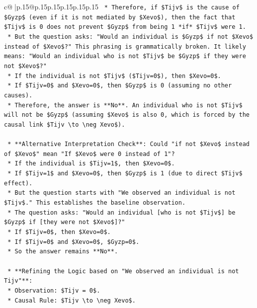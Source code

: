 \documentclass{article}
\begin{document}
{\begin{supertabular}{c@{$\;$}|p{.15\linewidth}@{}p{.15\linewidth}p{.15\linewidth}p{.15\linewidth}p{.15\linewidth}p{.15\linewidth}}
{{{\texttt{        *   Therefore, if \$Tijv\$ is the cause of \$Gyzp\$ (even if it is not mediated by \$Xevo\$), then the fact that \$Tijv\$ is 0 does not prevent \$Gyzp\$ from being 1 *if* \$Tijv\$ were 1.} \\
\texttt{        *   But the question asks: "Would an individual is \$Gyzp\$ if not \$Xevo\$ instead of \$Xevo\$?" This phrasing is grammatically broken. It likely means: "Would an individual who is not \$Tijv\$ be \$Gyzp\$ if they were not \$Xevo\$?"} \\
\texttt{        *   If the individual is not \$Tijv\$ (\$Tijv=0\$), then \$Xevo=0\$.} \\
\texttt{        *   If \$Tijv=0\$ and \$Xevo=0\$, then \$Gyzp\$ is 0 (assuming no other causes).} \\
\texttt{        *   Therefore, the answer is **No**. An individual who is not \$Tijv\$ will not be \$Gyzp\$ (assuming \$Xevo\$ is also 0, which is forced by the causal link \$Tijv \textbackslash{}to \textbackslash{}neg Xevo\$).} \\
\\ 
\texttt{    *   **Alternative Interpretation Check**: Could "if not \$Xevo\$ instead of \$Xevo\$" mean "If \$Xevo\$ were 0 instead of 1"?} \\
\texttt{        *   If the individual is \$Tijv=1\$, then \$Xevo=0\$.} \\
\texttt{        *   If \$Tijv=1\$ and \$Xevo=0\$, then \$Gyzp\$ is 1 (due to direct \$Tijv\$ effect).} \\
\texttt{        *   But the question starts with "We observed an individual is not \$Tijv\$." This establishes the baseline observation.} \\
\texttt{        *   The question asks: "Would an individual {[}who is not \$Tijv\${]} be \$Gyzp\$ if {[}they were not \$Xevo\${]}?"} \\
\texttt{        *   If \$Tijv=0\$, then \$Xevo=0\$.} \\
\texttt{        *   If \$Tijv=0\$ and \$Xevo=0\$, \$Gyzp=0\$.} \\
\texttt{        *   So the answer remains **No**.} \\
\\ 
\texttt{    *   **Refining the Logic based on "We observed an individual is not Tijv"**:} \\
\texttt{        *   Observation: \$Tijv = 0\$.} \\
\texttt{        *   Causal Rule: \$Tijv \textbackslash{}to \textbackslash{}neg Xevo\$.} \\
}}}
\end{supertabular}}
\end{document}
